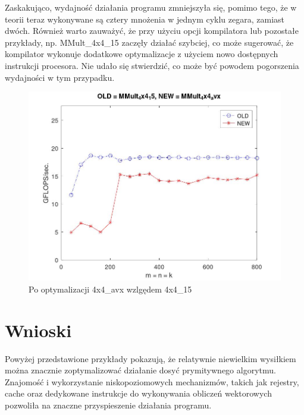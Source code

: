 \documentclass{article}
\begin{document}
Zaskakująco, wydajność działania programu zmniejszyła się, pomimo tego, że w teorii teraz wykonywane
są cztery mnożenia w jednym cyklu zegara, zamiast dwóch. Również warto zauważyć, że przy użyciu
opcji kompilatora  lub  pozostałe przykłady, np.
MMult\_4x4\_15 zaczęły działać szybciej, co może sugerować, że kompilator wykonuje
dodatkowe optymalizacje z użyciem nowo dostępnych instrukcji procesora. Nie udało się
stwierdzić, co może być powodem pogorszenia wydajności w tym przypadku.

\begin{figure}[H]
    \centering
    \includegraphics[width=1.0\textwidth]{figure10.jpg}
    \caption{Po optymalizacji 4x4\_avx wzlgędem 4x4\_15}
\end{figure}

\section{Wnioski}

Powyżej przedstawione przykłady pokazują, że relatywnie niewielkim wysiłkiem można znacznie
zoptymalizować działanie dosyć prymitywnego algorytmu. Znajomość i wykorzystanie
niskopoziomowych mechanizmów, takich jak rejestry, cache oraz dedykowane instrukcje
do wykonywania obliczeń wektorowych pozwoliła na znaczne przyspieszenie działania programu.
\end{document}
